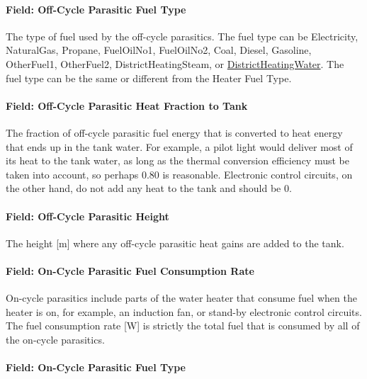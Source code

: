 \paragraph{Field: Off-Cycle Parasitic Fuel Type}\label{field-off-cycle-parasitic-fuel-type-1}

The type of fuel used by the off-cycle parasitics. The fuel type can be Electricity, NaturalGas, Propane, FuelOilNo1, FuelOilNo2, Coal, Diesel, Gasoline, OtherFuel1, OtherFuel2, DistrictHeatingSteam, or \hyperref[districtheating]{DistrictHeatingWater}. The fuel type can be the same or different from the Heater Fuel Type.

\paragraph{Field: Off-Cycle Parasitic Heat Fraction to Tank}\label{field-off-cycle-parasitic-heat-fraction-to-tank-1}

The fraction of off-cycle parasitic fuel energy that is converted to heat energy that ends up in the tank water. For example, a pilot light would deliver most of its heat to the tank water, as long as the thermal conversion efficiency must be taken into account, so perhaps 0.80 is reasonable. Electronic control circuits, on the other hand, do not add any heat to the tank and should be 0.

\paragraph{Field: Off-Cycle Parasitic Height}\label{field-off-cycle-parasitic-height}

The height {[}m{]} where any off-cycle parasitic heat gains are added to the tank.

\paragraph{Field: On-Cycle Parasitic Fuel Consumption Rate}\label{field-on-cycle-parasitic-fuel-consumption-rate-1}

On-cycle parasitics include parts of the water heater that consume fuel when the heater is on, for example, an induction fan, or stand-by electronic control circuits. The fuel consumption rate {[}W{]} is strictly the total fuel that is consumed by all of the on-cycle parasitics.

\paragraph{Field: On-Cycle Parasitic Fuel Type}\label{field-on-cycle-parasitic-fuel-type-1}

